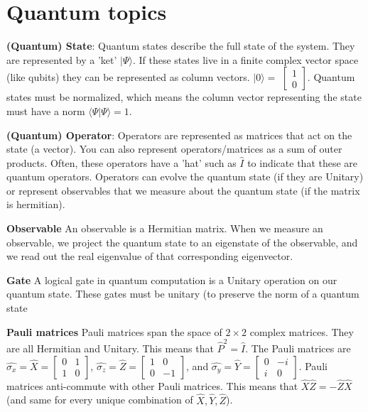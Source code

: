\documentclass{article}
\begin{document}
\section{Quantum topics}

\textbf{(Quantum) State}: Quantum states describe the full state of the system. They are represented by a 'ket' $|\Psi\rangle$. If these states live in a finite complex vector space (like qubits) they can be represented as column vectors. $|0\rangle=$ 
$\begin{bmatrix}1\\0\end{bmatrix}$.
Quantum states must be normalized, which means the column vector representing the state must have a norm $\langle\Psi|\Psi\rangle=1$.

\textbf{(Quantum) Operator}: Operators are represented as matrices that act on the state (a vector). You can also represent operators/matrices as a sum of outer products. Often, these operators have a 'hat' such as $\hat{I}$ to indicate that these are quantum operators. Operators can evolve the quantum state (if they are Unitary) or represent observables that we measure about the quantum state (if the matrix is hermitian).

\noindent \textbf{Observable} An observable is a Hermitian matrix. When we measure an observable, we project the quantum state to an eigenstate of the observable, and we read out the real eigenvalue of that corresponding eigenvector.

\noindent \textbf{Gate} A logical gate in quantum computation is a Unitary operation on our quantum state. These gates must be unitary (to preserve the norm of a quantum state

\textbf{Pauli matrices} Pauli matrices span the space of $2\times 2$ complex matrices. They are all Hermitian and Unitary. This means that $\hat{P}^2=\hat{I}$. The Pauli matrices are $\hat{\sigma_x}=\hat{X}= \begin{bmatrix}0&1\\1&0\end{bmatrix}$, $\hat{\sigma_z}=\hat{Z}= \begin{bmatrix}1&0\\0&-1\end{bmatrix}$, and $\hat{\sigma_y}=\hat{Y}= \begin{bmatrix}0&-i\\i&0\end{bmatrix}$. Pauli matrices anti-commute with other Pauli matrices. This means that $\hat{X}\hat{Z}=-\hat{Z}\hat{X}$ (and same for every unique combination of $\hat{X},\hat{Y},\hat{Z}$).
\end{document}
